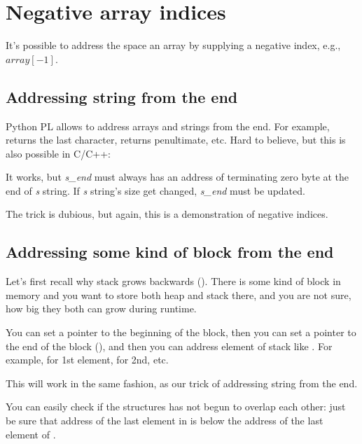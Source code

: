 \section{Negative array indices}
\label{negative_array_indices}

It's possible to address the space  an array by supplying a negative index, e.g., $array[-1]$.

\subsection{Addressing string from the end}

Python \ac{PL} allows to address arrays and strings from the end.
For example,  returns the last character,  returns penultimate, etc.
Hard to believe, but this is also possible in C/C++:



It works, but \textit{s\_end} must always has an address of terminating zero byte at the end of \textit{s} string.
If \textit{s} string's size get changed, \textit{s\_end} must be updated.

The trick is dubious, but again, this is a demonstration of negative indices.

\subsection{Addressing some kind of block from the end}

Let's first recall why stack grows backwards ().
There is some kind of block in memory and you want to store both heap and stack there, and you are not sure,
how big they both can grow during runtime.

You can set a  pointer to the beginning of the block,
then you can set a  pointer to the end of the block (),
and then you can address  element of stack like .
For example,  for 1st element,  for 2nd, etc.

This will work in the same fashion, as our trick of addressing string from the end.

You can easily check if the structures has not begun to overlap each other:
just be sure that address of the last element in  is below the address of the last element of .

